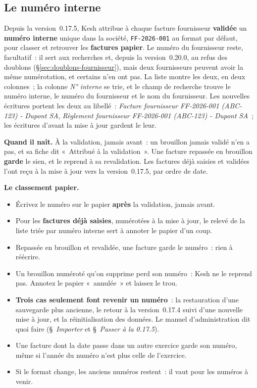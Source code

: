 \documentclass[a4paper,11pt,oneside]{article}
\begin{document}
\subsection{Le numéro interne}\label{sec:numero-interne-fournisseur}

Depuis la version~0.17.5, Kesh attribue à chaque facture fournisseur \textbf{validée} un \textbf{numéro interne} unique dans la société, \texttt{FF-2026-001} au format par défaut, pour classer et retrouver les \textbf{factures papier}. Le numéro du fournisseur reste, facultatif~: il sert aux recherches et, depuis la version~0.20.0, au refus des doublons (\S\ref{sec:doublons-fournisseur}), mais deux fournisseurs peuvent avoir la même numérotation, et certains n'en ont pas. La liste montre les deux, en deux colonnes~; la colonne \emph{N° interne} se trie, et le champ de recherche trouve le numéro interne, le numéro du fournisseur et le nom du fournisseur. Les nouvelles écritures portent les deux au libellé~: \emph{Facture fournisseur FF-2026-001 (ABC-123) - Dupont SA}, \emph{Règlement fournisseur FF-2026-001 (ABC-123) - Dupont SA}~; les écritures d'avant la mise à jour gardent le leur.

\textbf{Quand il naît.} À la validation, jamais avant~: un brouillon jamais validé n'en a pas, et sa fiche dit «~Attribué à la validation~». Une facture repassée en brouillon \textbf{garde} le sien, et le reprend à sa revalidation. Les factures déjà saisies et validées l'ont reçu à la mise à jour vers la version~0.17.5, par ordre de date.

\textbf{Le classement papier.}
\begin{itemize}
    \item Écrivez le numéro sur le papier \textbf{après} la validation, jamais avant.
    \item Pour les \textbf{factures déjà saisies}, numérotées à la mise à jour, le relevé de la liste triée par numéro interne sert à annoter le papier d'un coup.
    \item Repassée en brouillon et revalidée, une facture garde le numéro~: rien à réécrire.
    \item Un brouillon numéroté qu'on supprime perd son numéro~: Kesh ne le reprend pas. Annotez le papier «~annulée~» et laissez le trou.
    \item \textbf{Trois cas seulement font revenir un numéro}~: la restauration d'une sauvegarde plus ancienne, le retour à la version~0.17.4 suivi d'une nouvelle mise à jour, et la réinitialisation des données. Le manuel d'administration dit quoi faire (§~\emph{Importer} et §~\emph{Passer à la 0.17.5}).
    \item Une facture dont la date passe dans un autre exercice garde son numéro, même si l'année du numéro n'est plus celle de l'exercice.
    \item Si le format change, les anciens numéros restent~: il vaut pour les numéros à venir.
\end{itemize}
\end{document}
